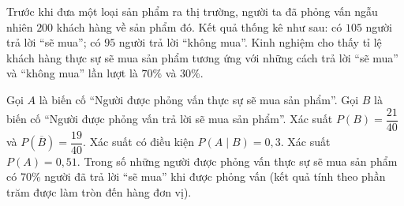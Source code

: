 \begin{ex}
Trước khi đưa một loại sản phẩm ra thị trường, người ta đã phỏng vấn ngẫu nhiên $200$ khách hàng về sản phẩm đó. Kết quả thống kê như sau: có $105$ người trả lời ``sẽ mua''; có $95$ người trả lời ``không mua''. Kinh nghiệm cho thấy tỉ lệ khách hàng thực sự sẽ mua sản phẩm tương ứng với những cách trả lời ``sẽ mua'' và ``không mua'' lần lượt là $70\%$ và $30\%$.

Gọi $A$ là biến cố ``Người được phỏng vấn thực sự sẽ mua sản phẩm''. Gọi $B$ là biến cố ``Người được phỏng vấn trả lời sẽ mua sản phẩm''.
\choiceTF
{\True Xác suất $P(B)=\dfrac{21}{40}$ và $P(\overline B)=\dfrac{19}{40}$.}
{Xác suất có điều kiện $P(A\mid B)=0{,}3$.}
{\True Xác suất $P(A)=0{,}51$.}
{Trong số những người được phỏng vấn thực sự sẽ mua sản phẩm có $70\%$ người đã trả lời ``sẽ mua'' khi được phỏng vấn (kết quả tính theo phần trăm được làm tròn đến hàng đơn vị).}
\end{ex}
